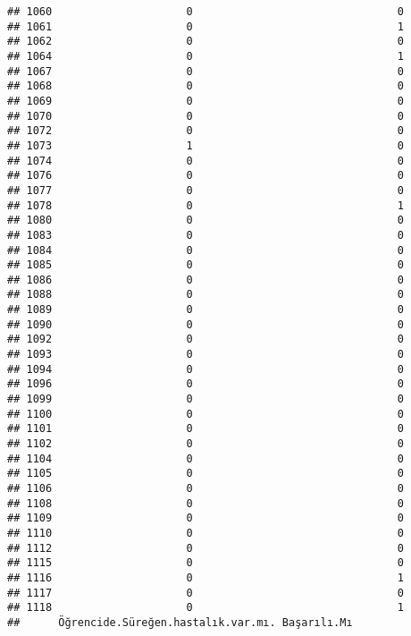 \documentclass[
]{article}
\begin{document}
\begin{verbatim}
## 1060                     0                                0
## 1061                     0                                1
## 1062                     0                                0
## 1064                     0                                1
## 1067                     0                                0
## 1068                     0                                0
## 1069                     0                                0
## 1070                     0                                0
## 1072                     0                                0
## 1073                     1                                0
## 1074                     0                                0
## 1076                     0                                0
## 1077                     0                                0
## 1078                     0                                1
## 1080                     0                                0
## 1083                     0                                0
## 1084                     0                                0
## 1085                     0                                0
## 1086                     0                                0
## 1088                     0                                0
## 1089                     0                                0
## 1090                     0                                0
## 1092                     0                                0
## 1093                     0                                0
## 1094                     0                                0
## 1096                     0                                0
## 1099                     0                                0
## 1100                     0                                0
## 1101                     0                                0
## 1102                     0                                0
## 1104                     0                                0
## 1105                     0                                0
## 1106                     0                                0
## 1108                     0                                0
## 1109                     0                                0
## 1110                     0                                0
## 1112                     0                                0
## 1115                     0                                0
## 1116                     0                                1
## 1117                     0                                0
## 1118                     0                                1
##      Öğrencide.Süreğen.hastalık.var.mı. Başarılı.Mı

\end{verbatim}
\end{document}
